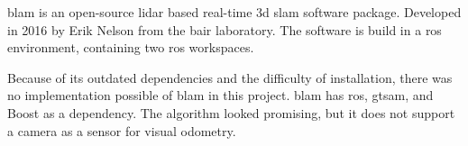 \acs{blam} is an open\hyp{}source \acs{lidar} based real\hyp{}time \acs{3d} \acs{slam} software package. Developed in 2016 by Erik Nelson from the \ac{bair} laboratory. The software is build in a \acs{ros} environment, containing two \acs{ros} workspaces. \cite{github_blam}

Because of its outdated dependencies and the difficulty of installation, there was no implementation possible of \acs{blam} in this project. \acs{blam} has \acs{ros}, \acs{gtsam}, and Boost as a dependency. The algorithm looked promising, but it does not support a camera as a sensor for visual odometry.